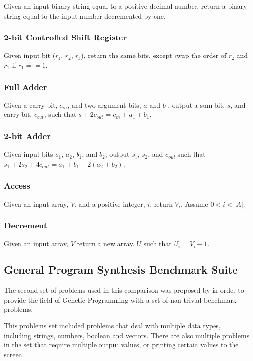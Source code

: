 Given an input binary string equal to a positive decimal number, return a binary string equal to the input number decremented by one.

\subsubsection{2-bit Controlled Shift Register}

Given input bit ($r_1$, $r_2$, $r_3$), return the same bits, except swap the order of $r_2$ and $r_1$ if $r_1 == 1$.

\subsubsection{Full Adder}

Given a carry bit, $c_{in}$, and two argument bits, $a$ and $b$ , output a sum bit, $s$, and carry bit, $c_{out}$, such that  $s + 2c_{out} = c_{in} + a_1 + b_1$.

\subsubsection{2-bit Adder}

Given input bits $a_1$, $a_2$, $b_1$, and $b_2$, output $s_1$, $s_2$, and $c_{out}$ such that  $s_1 + 2s_2 + 4c_{out} = a_1 + b_1 + 2(a_2 + b_2)$.

\subsubsection{Access}

Given an input array, $V$, and a positive integer, $i$, return $V_i$. Assume $0 < i < |A|$.

\subsubsection{Decrement}

Given an input array, $V$ return a new array, $U$ such that $U_i = V_i - 1$.


\subsection{General Program Synthesis Benchmark Suite}
The second set of problems used in this comparison was proposed by \cite{Helmuth2015b} in order to provide the field of Genetic Programming with a set of non-trivial benchmark problems.

This problems set included problems that deal with multiple data types, including strings, numbers, boolean and vectors. There are also multiple problems in the set that require multiple output values, or printing certain values to the screen.

